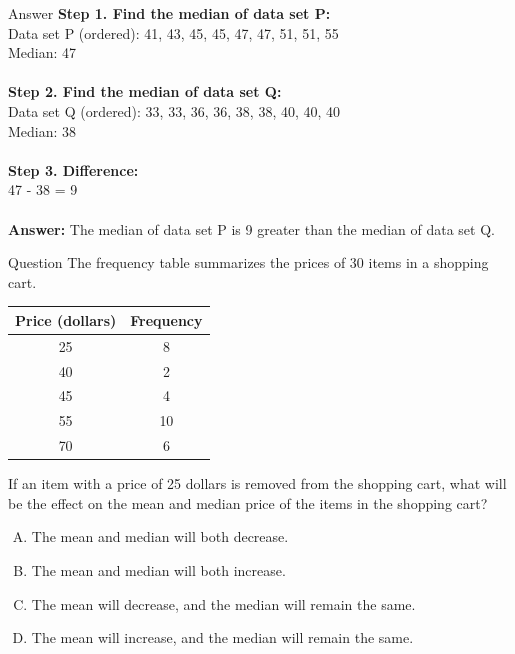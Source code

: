 \documentclass{beamer}
\begin{document}
\begin{frame}{Answer}
\textbf{Step 1. Find the median of data set P:} \\
Data set P (ordered): 41, 43, 45, 45, 47, 47, 51, 51, 55 \\
Median: 47 \\
\\
\textbf{Step 2. Find the median of data set Q:} \\
Data set Q (ordered): 33, 33, 36, 36, 38, 38, 40, 40, 40 \\
Median: 38 \\
\\
\textbf{Step 3. Difference:} \\
47 - 38 = 9 \\
\\
\textbf{Answer:} The median of data set P is 9 greater than the median of data set Q.
\end{frame}

\begin{frame}{Question}
The frequency table summarizes the prices of 30 items in a shopping cart.

\begin{center}
\begin{tabular}{|c|c|}
\hline
\textbf{Price (dollars)} & \textbf{Frequency} \\
\hline
25 & 8 \\
40 & 2 \\
45 & 4 \\
55 & 10 \\
70 & 6 \\
\hline
\end{tabular}
\end{center}

If an item with a price of 25 dollars is removed from the shopping cart, what will be the effect on the mean and median price of the items in the shopping cart?

\begin{enumerate}[A.]
    \item The mean and median will both decrease.
    \item The mean and median will both increase.
    \item The mean will decrease, and the median will remain the same.
    \item The mean will increase, and the median will remain the same.
\end{enumerate}
\end{frame}
\end{document}
